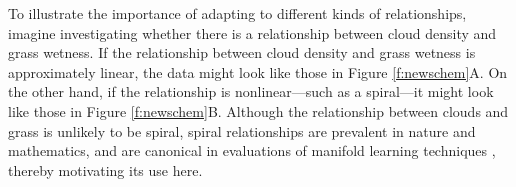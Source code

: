 \documentclass[11pt]{article}
\begin{document}
To illustrate the importance of adapting to different kinds of relationships, imagine investigating whether there is a relationship between cloud density and grass wetness. If the relationship between cloud density and grass wetness is approximately linear, the data might look like those in Figure \ref{f:newschem}{\color{magenta}A}. 
On the other hand, if the relationship is nonlinear---such as a  spiral---it might look like those in Figure \ref{f:newschem}{\color{magenta}B}.
Although the relationship between clouds and grass is unlikely to be spiral, spiral relationships are prevalent in nature and mathematics, and are canonical in evaluations of manifold learning techniques \cite{Lee07a}, thereby motivating its use here.
\end{document}
